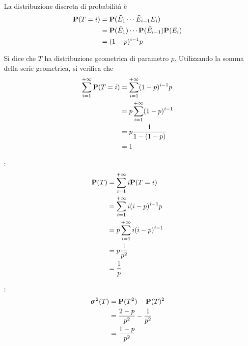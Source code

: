 La distribuzione discreta di probabilità è
\begin{align*}
  \mathbf{P}(T = i) &= \mathbf{P}(\tilde{E}_1 \cdots \tilde{E}_{i-1} E_i) \\
  &= \mathbf{P}(\tilde{E}_1) \cdots \mathbf{P}(\tilde{E}_{i-1}) \mathbf{P}(E_i) \\
  &= (1-p)^{i-1} p  
\end{align*}

Si dice che \( T \) ha distribuzione geometrica di parametro \( p \).
Utilizzando la somma della serie geometrica, si verifica che
\begin{align*}
  \sum_{i=1}^{+ \infty} \mathbf{P}(T = i) &= \sum_{i=1}^{+ \infty} (1-p)^{i-1} p \\
  &= p \sum_{i=1}^{+ \infty} (1-p)^{i-1}  \\
  &= p \frac{1}{1-(1-p)} \\
  &= 1
\end{align*}


:
\begin{align*}
  \mathbf{P}(T) &= \sum_{i=1}^{+ \infty} i \mathbf{P}(T = i) \\
  &= \sum_{i=1}^{+ \infty} i (i - p)^{i-1} p \\
  &= p \sum_{i=1}^{+ \infty} i (i - p)^{i-1} \\
  &= p \frac{1}{p^2} \\
  &= \frac{1}{p}
\end{align*}

:
\begin{align*}
  \boldsymbol\sigma^2(T) &= \mathbf{P}(T^2) - \mathbf{P}(T)^2 \\
  &= \frac{2-p}{p^2} - \frac{1}{p^2} \\
  &= \frac{1-p}{p^2}
\end{align*}

